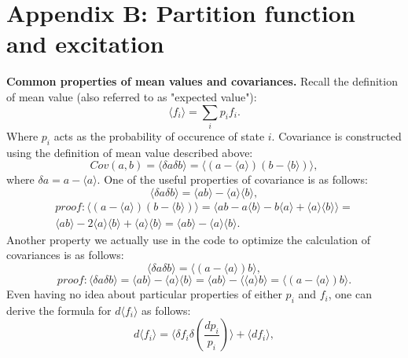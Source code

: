 \section{Appendix B: Partition function and excitation}
{\bf Common properties of mean values and covariances.}
Recall the definition of mean value (also referred to as "expected value"):
\begin{equation}
\langle f_i \rangle = \sum_i p_i f_i.
\end{equation}
Where $p_i$ acts as the probability of occurence of state $i$.
Covariance is constructed using the definition of mean value described above:
\begin{equation}
Cov(a,b) = \langle \delta a \delta b \rangle =
\langle (a - \langle a \rangle) (b - \langle b \rangle) \rangle,
\end{equation}
where $\delta a = a - \langle a \rangle$.
One of the useful properties of covariance is as follows:
\begin{equation}
\langle \delta a \delta b \rangle = \langle ab \rangle - \langle a \rangle \langle b \rangle,
\end{equation}
\begin{eqnarray}
\nonumber proof: \langle (a - \langle a \rangle) (b - \langle b \rangle) \rangle =
\langle ab - a \langle b \rangle - b \langle a \rangle + \langle a \rangle \langle b \rangle \rangle = \\ \nonumber
\langle ab \rangle - 2 \langle a \rangle \langle b \rangle + \langle a \rangle \langle b \rangle =
\langle ab \rangle - \langle a \rangle \langle b \rangle.
\end{eqnarray}
Another property we actually use in the code to optimize the
calculation of covariances is as follows:
\begin{equation}
\langle \delta a \delta b \rangle = \langle (a - \langle a \rangle) b \rangle,
\end{equation}
\begin{equation}
\nonumber proof: \langle \delta a \delta b \rangle =
\langle ab \rangle - \langle a \rangle \langle b \rangle =
\langle ab \rangle - \langle \langle a \rangle b \rangle =
\langle (a - \langle a \rangle) b \rangle.
\end{equation}
Even having no idea about particular properties of either $p_i$ and $f_i$,
one can derive the formula for $d \langle f_i \rangle$ as follows:
\begin{equation}
d \langle f_i \rangle = \langle \delta f_i \delta \left( \frac{d p_i}{p_i} \right) \rangle +
\langle d f_i \rangle,
\end{equation}
